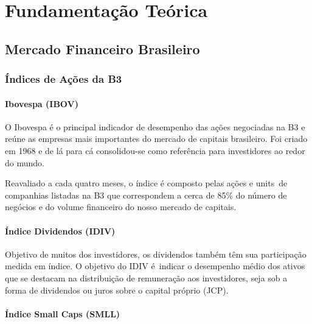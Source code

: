 \chapter{Fundamentação Teórica} \label{Cap:Fund_Teo}


\section{Mercado Financeiro Brasileiro}


\subsection{Índices de Ações da B3}

\subsubsection{Ibovespa (IBOV)}

O Ibovespa é o principal indicador de desempenho das ações negociadas na B3 e reúne as empresas mais importantes do mercado de capitais brasileiro. Foi criado em 1968 e de lá para cá consolidou-se como referência para investidores ao redor do mundo.

Reavaliado a cada quatro meses, o índice é composto pelas ações e units de companhias listadas na B3 que correspondem a cerca de 85\% do número de negócios e do volume financeiro do nosso mercado de capitais.

\subsubsection{Índice Dividendos (IDIV)}

Objetivo de muitos dos investidores, os dividendos também têm sua participação medida em índice. O objetivo do IDIV é indicar o desempenho médio dos ativos que se destacam na distribuição de remuneração aos investidores, seja sob a forma de dividendos ou juros sobre o capital próprio (JCP).

\subsubsection{Índice Small Caps (SMLL)}

